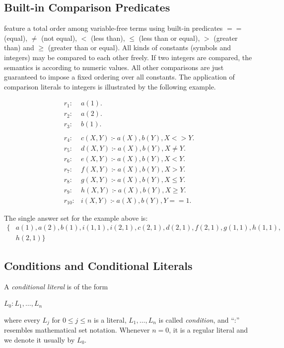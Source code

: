 \documentclass[a4paper, titlepage]{article}
\DeclareMathOperator{\leftimpl}{:-}
\begin{document}
\subsection{Built-in Comparison Predicates}
\dlvhex{} feature a total order among variable-free terms 
using built-in predicates $==$ (equal), $\neq$ (not equal), 
$<$ (less than), $\leq$ (less than or equal), $>$ (greater 
than) and $\geq$ (greater than or equal). All kinds of 
constants (symbols and integers) may be compared to 
each other freely. If two integers are compared, the 
semantics is according to numeric values. All other 
comparisons are just guaranteed to impose a fixed ordering 
over all constants. The application of comparison literals 
to integers is illustrated by the following example.
\begin{exmp}
\begin{align*}
r_1\colon& a(1). \\
r_2\colon& a(2). \\
r_3\colon& b(1). \\
\\
r_4\colon& c(X,Y) \leftimpl a(X), b(Y), X <> Y. \\
r_5\colon& d(X,Y) \leftimpl a(X), b(Y), X \neq Y. \\
r_6\colon& e(X,Y) \leftimpl a(X), b(Y), X < Y. \\
r_7\colon& f(X,Y) \leftimpl a(X), b(Y), X > Y. \\
r_8\colon& g(X,Y) \leftimpl a(X), b(Y), X \leq Y. \\
r_{9}\colon& h(X,Y) \leftimpl a(X), b(Y), X \geq Y. \\
r_{10}\colon& i(X,Y) \leftimpl a(X), b(Y), Y == 1. 
\end{align*}
\end{exmp}
The single answer set for the example above is:
\begin{align*}
\{ & \mathit{a(1),a(2),b(1),i(1,1),i(2,1),c(2,1),d(2,1),f(2,1),g(1,1),h(1,1)},\\
   & \mathit{h(2,1)}\}
\end{align*}

\subsection{Conditions and Conditional Literals}
\label{conditions}
A \emph{conditional literal} is of the form \\ 
\centerline{$L_0:L_1,\dots,L_n$} where every $\mathit{L_j}$ 
for $0 \leq j \leq n$ is a literal, $L_1,\dots,L_n$ is 
called \emph{condition}, and \enquote{:} resembles 
mathematical set notation. Whenever $\mathit{n = 0}$, it is 
a regular literal and we denote it usually by $L_0$.
\end{document}
